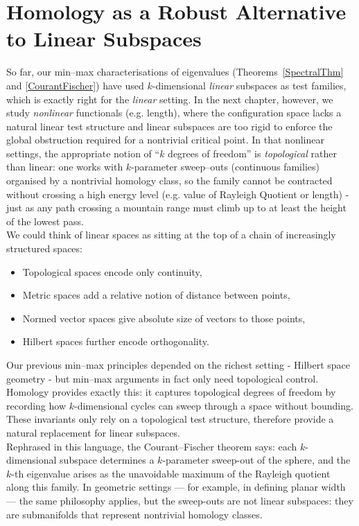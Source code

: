 \section{Homology as a Robust Alternative to Linear Subspaces}\label{section:cyclesboundaries}
So far, our min--max characterisations of eigenvalues (Theorems~\ref{SpectralThm} and \ref{CourantFischer}) have used $k$-dimensional \emph{linear} subspaces as test families, which is exactly right for the \emph{linear} setting. In the next chapter, however, we study \emph{nonlinear} functionals (e.g. length), where the configuration space lacks a natural linear test structure and linear subspaces are too rigid to enforce the global obstruction required for a nontrivial critical point. In that nonlinear settings, the appropriate notion of “$k$ degrees of freedom” is \emph{topological} rather than linear: one works with $k$-parameter sweep--outs (continuous families) organised by a nontrivial homology class, so the family cannot be contracted without crossing a high energy level (e.g. value of Rayleigh Quotient or length) - just as any path crossing a mountain range must climb up to at least the height of the lowest pass.\\
We could think of linear spaces as sitting at the top of a chain of increasingly structured spaces:
\begin{itemize}
    \item Topological spaces encode only continuity,
    \item Metric spaces add a relative notion of distance between points,
    \item Normed vector spaces give absolute size of vectors to those points,
    \item Hilbert spaces further encode orthogonality.
\end{itemize}
Our previous min–max principles depended on the richest setting - Hilbert space geometry - but min–max arguments in fact only need topological control. Homology provides exactly this: it captures topological degrees of freedom by recording how $k$-dimensional cycles can sweep through a space without bounding. These invariants only rely on a topological test structure, therefore provide a natural replacement for linear subspaces.\\
Rephrased in this language, the Courant--Fischer theorem says: each $k$-dimensional subspace determines a $k$-parameter sweep-out of the sphere, and the $k$-th eigenvalue arises as the unavoidable maximum of the Rayleigh quotient along this family. In geometric settings — for example, in defining planar width — the same philosophy applies, but the sweep-outs are not linear subspaces: they are submanifolds that represent nontrivial homology classes.\\
